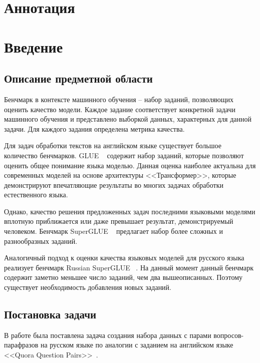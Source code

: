 \documentclass[a4paper,14pt]{extarticle}
\begin{document}
\newpage

{
	\hypersetup{linkcolor=black}
	\tableofcontents
}

\newpage
\section{Аннотация}
\newpage

\section{Введение}
\subsection{Описание предметной области}

Бенчмарк в контексте машинного обучения -- набор заданий, позволяющих оценить качество модели. Каждое задание соответствует конкретной задачи машинного обучения и представлено выборкой данных, характерных для данной задачи. Для каждого задания определена метрика качества.

Для задач обработки текстов на английском языке существует большое количество бенчмарков.
GLUE ~\autocite{wang2018glue} содержит набор заданий, которые позволяют оценить общее понимание языка моделью. Данная оценка наиболее актуальна для современных моделей на основе архитектуры <<Трансформер>>, которые демонстрируют впечатляющие результаты во многих задачах обработки естественного языка.

Однако, качество решения предложенных задач последними языковыми моделями вплотную приближается или даже превышает результат, демонстрируемый человеком.
Бенчмарк SuperGLUE ~\autocite{wang2019superglue} предлагает набор более сложных и разнообразных заданий.

Аналогичный подход к оценки качества языковых моделей для русского языка реализует бенчмарк Russian SuperGLUE ~\autocite{shavrina2020russiansuperglue}.
На данный момент данный бенчмарк содержит заметно меньшее число заданий, чем два вышеописанных.
Поэтому существует необходимость добавления новых заданий.

\subsection{Постановка задачи}

В работе была поставлена задача создания набора данных с парами вопросов-парафразов на русском языке по аналогии с заданием на английском языке {<<Quora Question Pairs>>}~\autocite{iyer_csernai_dandekar_2017}.
\end{document}
